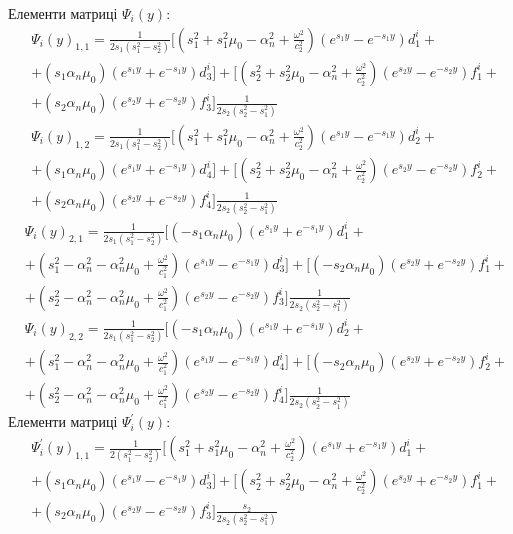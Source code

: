 Елементи матриці $\Psi_i(y)$:
\begin{align*}
    &\Psi_i(y)_{1,1}= \frac{1}{2 s_1 (s_1^2 - s_2^2)} [(s_1^2 + s_1^2 \mu_0 - \alpha_n^2 + \frac{\omega^2}{c_2^2}) (e^{s_1 y} - e^{-s_1 y}) d_1^i + \\
    &+ (s_1 \alpha_n \mu_0) (e^{s_1 y} + e^{-s_1 y}) d_3^i ]
    + [(s_2^2 + s_2^2 \mu_0 - \alpha_n^2 + \frac{\omega^2}{c_2^2}) (e^{s_2 y} - e^{-s_2 y}) f_1^i + \\
    &+ (s_2 \alpha_n \mu_0) (e^{s_2 y} + e^{-s_2 y}) f_3^i ] \frac{1}{2 s_2 (s_2^2 - s_1^2)}
\end{align*}
\begin{align*}
    &\Psi_i(y)_{1,2}= \frac{1}{2 s_1 (s_1^2 - s_2^2)} [(s_1^2 + s_1^2 \mu_0 - \alpha_n^2 + \frac{\omega^2}{c_2^2}) (e^{s_1 y} - e^{-s_1 y}) d_2^i + \\
    &+ (s_1 \alpha_n \mu_0) (e^{s_1 y} + e^{-s_1 y}) d_4^i ]
    + [(s_2^2 + s_2^2 \mu_0 - \alpha_n^2 + \frac{\omega^2}{c_2^2}) (e^{s_2 y} - e^{-s_2 y}) f_2^i + \\
    &+ (s_2 \alpha_n \mu_0) (e^{s_2 y} + e^{-s_2 y}) f_4^i ] \frac{1}{2 s_2 (s_2^2 - s_1^2)}
\end{align*}
\begin{align*}
    &\Psi_i(y)_{2,1}= \frac{1}{2 s_1 (s_1^2 - s_2^2)} [(-s_1 \alpha_n \mu_0) (e^{s_1 y} + e^{-s_1 y}) d_1^i + \\
    &+ (s_1^2 - \alpha_n^2 - \alpha_n^2\mu_0 + \frac{\omega^2}{c_1^2}) (e^{s_1 y} - e^{-s_1 y}) d_3^i ]
    + [(-s_2 \alpha_n \mu_0) (e^{s_2 y} + e^{-s_2 y}) f_1^i + \\
    &+ (s_2^2 - \alpha_n^2 - \alpha_n^2\mu_0 + \frac{\omega^2}{c_1^2}) (e^{s_2 y} - e^{-s_2 y}) f_3^i ] \frac{1}{2 s_2 (s_2^2 - s_1^2)}
\end{align*}
\begin{align*}
    &\Psi_i(y)_{2,2}= \frac{1}{2 s_1 (s_1^2 - s_2^2)} [(-s_1 \alpha_n \mu_0) (e^{s_1 y} + e^{-s_1 y}) d_2^i + \\
    &+ (s_1^2 - \alpha_n^2 - \alpha_n^2\mu_0 + \frac{\omega^2}{c_1^2}) (e^{s_1 y} - e^{-s_1 y}) d_4^i ]
    + [(-s_2 \alpha_n \mu_0) (e^{s_2 y} + e^{-s_2 y}) f_2^i + \\
    &+ (s_2^2 - \alpha_n^2 - \alpha_n^2\mu_0 + \frac{\omega^2}{c_1^2}) (e^{s_2 y} - e^{-s_2 y}) f_4^i ] \frac{1}{2 s_2 (s_2^2 - s_1^2)}
\end{align*}
Елементи матриці $\Psi_i^{'}(y)$:
\begin{align*}
    &\Psi_i^{'}(y)_{1,1}= \frac{1}{2 (s_1^2 - s_2^2)} [(s_1^2 + s_1^2 \mu_0 - \alpha_n^2 + \frac{\omega^2}{c_2^2}) (e^{s_1 y} + e^{-s_1 y}) d_1^i + \\
    &+ (s_1 \alpha_n \mu_0) (e^{s_1 y} - e^{-s_1 y}) d_3^i ]
    + [(s_2^2 + s_2^2 \mu_0 - \alpha_n^2 + \frac{\omega^2}{c_2^2}) (e^{s_2 y} + e^{-s_2 y}) f_1^i + \\
    &+ (s_2 \alpha_n \mu_0) (e^{s_2 y} - e^{-s_2 y}) f_3^i ] \frac{s_2}{2 s_2 (s_2^2 - s_1^2)}
\end{align*}
